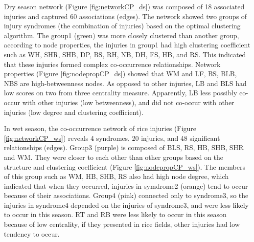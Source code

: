 Dry season network (Figure \ref{fig:networkCP_ds}) was composed of 18 associated injuries and captured 60 associations (edges). The network showed two groups of injury syndromes (the combination of injuries) based on the optimal clustering algorithm. The group1 (green) was more closely clustered than another group, according to node properties, the injuries in group1 had high clustering coefficient such as WH, SHR, SHB, DP, BS, RH, NB, DH, FS, HB, and RS. This indicated that these injuries formed complex co-occurrence relationships. Network properties (Figure \ref{fig:nodepropCP_ds}) showed that WM and LF, BS, BLB, NBS are high-betweenness nodes.  As opposed to other injuries, LB and BLS had low scores on two from three centrality measure. Apparently, LB less possibly co-occur with other injuries (low betweenness), and did not co-occur with other injuries (low degree and clustering coefficient).

In wet season, the co-occurrence network of rice injuries (Figure \ref{fig:networkCP_ws}) reveals 4 syndromes, 20 injuries, and 48  significant relationships (edges). Group3 (purple) is composed of BLS, RS, HB, SHB, SHR and WM. They were closer to each other than other groups based on the structure and clustering coefficient (Figure \ref{fig:nodepropCP_ws}). The members of this group such as WM, HB, SHB, RS also had high node degree, which indicated that when they occurred, injuries in symdrome2 (orange) tend to occur because of their associations. Group4 (pink) connected only to syndrome3, so the injuries in syndrome4 depended on the injuries of syndrome3, and were less likely to occur in this season.  RT and RB were less likely to occur in this season because of low centrality, if they presented in rice fields, other injuries had low tendency to occur. 

